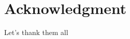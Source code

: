 \documentclass[english,11pt]{article}
\newcommand{\1}{\mathbf{1}}
\newcommand{\II}{\mathcal{I}}
\newcommand{\mk}{\mathfrak}
\numberwithin{equation}{section}
\theoremstyle{plain}
\theoremstyle{definition}
\theoremstyle{remark}
\theoremstyle{plain}
\theoremstyle{remark}
\theoremstyle{plain}
\theoremstyle{plain}
\newcommand{\be}
{\begin{equation}}
\newcommand{\ee}
{\end{equation}}
\begin{document}
%

\section*{Acknowledgment}
Let's thank them all






\appendix
\end{document}
